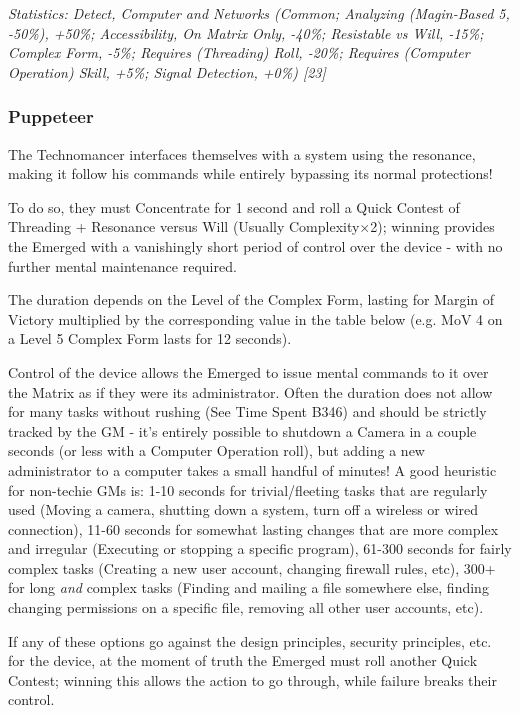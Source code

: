 \begin{multicols*}{3}
	\textcolor{OliveGreen}{\textit{Statistics: Detect, Computer and Networks (Common; Analyzing (Magin-Based 5, -50\%), +50\%; Accessibility, On Matrix Only, -40\%; Resistable vs Will, -15\%; Complex Form, -5\%; Requires (Threading) Roll, -20\%; Requires (Computer Operation) Skill, +5\%; Signal Detection, +0\%) [23]}}
	
	\subsubsection*{Puppeteer}\label{puppeteer}
	
	The Technomancer interfaces themselves with a system using the resonance, making it follow his commands while entirely bypassing its normal protections!
	
	To do so, they must Concentrate for 1 second and roll a Quick Contest of Threading + Resonance versus Will (Usually Complexity$\times$2); winning provides the Emerged with a vanishingly short period of control over the device - with no further mental maintenance required.
	
	The duration depends on the Level of the Complex Form, lasting for Margin of Victory multiplied by the corresponding value in the table below (e.g. MoV 4 on a Level 5 Complex Form lasts for 12 seconds).
	
	Control of the device allows the Emerged to issue mental commands to it over the Matrix as if they were its administrator. Often the duration does not allow for many tasks without rushing (See Time Spent B346) and should be strictly tracked by the GM - it's entirely possible to shutdown a Camera in a couple seconds (or less with a Computer Operation roll), but adding a new administrator to a computer takes a small handful of minutes! A good heuristic for non-techie GMs is: 1-10 seconds for trivial/fleeting tasks that are regularly used (Moving a camera, shutting down a system, turn off a wireless or wired connection), 11-60 seconds for somewhat lasting changes that are more complex and irregular (Executing or stopping a specific program), 61-300 seconds for fairly complex tasks (Creating a new user account, changing firewall rules, etc), 300+ for long \textit{and} complex tasks (Finding and mailing a file somewhere else, finding changing permissions on a specific file, removing all other user accounts, etc).
	
	If any of these options go against the design principles, security principles, etc. for the device, at the moment of truth the Emerged must roll another Quick Contest; winning this allows the action to go through, while failure breaks their control.
	

\end{multicols*}
